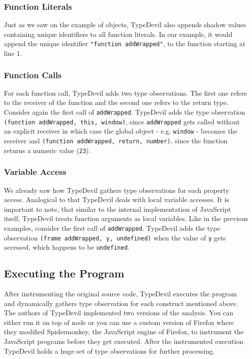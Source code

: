 \documentclass[runningheads,a4paper]{llncs}
\begin{document}
\subsubsection{Function Literals}
Just as we saw on the example of objects, TypeDevil also appends shadow values containing unique identifiers to all function literals.
In our example, it would append the unique identifier \lstinline[columns=fixed]{"function addWrapped"}, to the function starting at line 1.

\subsubsection{Function Calls}
For each function call, TypeDevil adds two type observations.
The first one refers to the receiver of the function and the second one refers to the return type.
Consider again the first call of \lstinline[columns=fixed]{addWrapped}.
TypeDevil adds the type observation \lstinline[columns=fixed]{(function addWrapped, this, window)}, since \lstinline[columns=fixed]{addWrapped} gets called without an explicit receiver in which case the global object - e.g. \lstinline[columns=fixed]{window} - becomes the receiver
and \lstinline[columns=fixed]{(function addWrapped, return, number)}, since the function returns a numeric value (\lstinline[columns=fixed]{23}).

\subsubsection{Variable Access}
We already saw how TypeDevil gathers type observations for each property access.
Analogical to that TypeDevil deals with local variable accesses.
It is important to note, that similar to the internal implementation of JavaScript itself, TypeDevil treats function arguments as local variables.
Like in the previous examples, consider the first call of \lstinline[columns=fixed]{addWrapped}.
TypeDevil adds the type observation \lstinline[columns=fixed]{(frame addWrapped, y, undefined)} when the value of \lstinline[columns=fixed]{y} gets accessed, which happens to be \lstinline[columns=fixed]{undefined}.

\subsection{Executing the Program}
After instrumenting the original source code, TypeDevil executes the program and dynamically gathers type observation for each construct mentioned above.
The authors of TypeDevil implemented two versions of the analysis. 
You can either run it on top of node or you can use a custom version of Firefox where they modified Spidermonkey, the JavaScript engine of Firefox, to instrument the JavaScript programs before they get executed.
After the instrumented execution TypeDevil holds a huge set of type observations for further processing.
\end{document}

